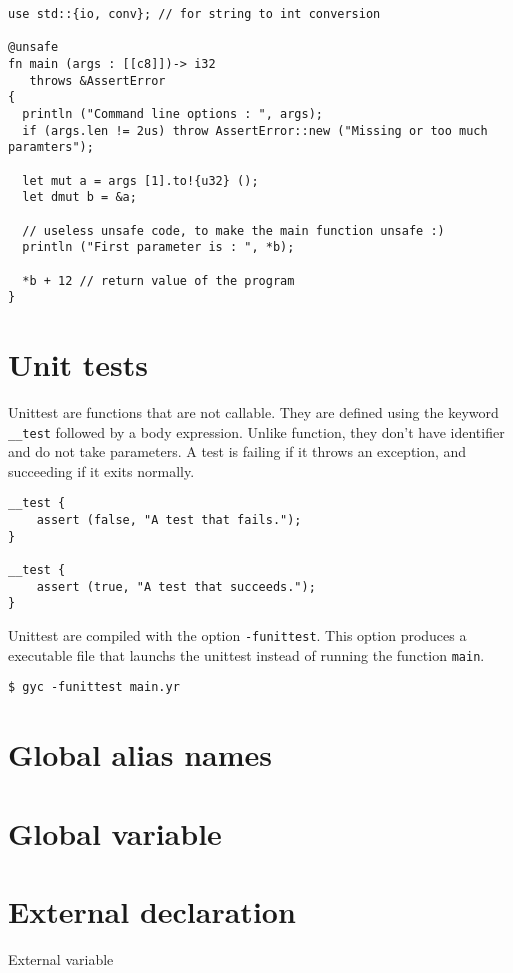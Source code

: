 \begin{lstlisting}[style=coloredverbatim, caption=The most complex main function]
use std::{io, conv}; // for string to int conversion

@unsafe
fn main (args : [[c8]])-> i32
   throws &AssertError
{
  println ("Command line options : ", args);
  if (args.len != 2us) throw AssertError::new ("Missing or too much paramters");

  let mut a = args [1].to!{u32} ();
  let dmut b = &a;

  // useless unsafe code, to make the main function unsafe :)
  println ("First parameter is : ", *b);

  *b + 12 // return value of the program
}
\end{lstlisting}



\section{Unit tests}%
\label{sec:unit_test}

Unittest are functions that are not callable. They are defined using the keyword
\texttt{\_\_test} followed by a body expression. Unlike function, they don't
have identifier and do not take parameters. A test is failing if it throws an
exception, and succeeding if it exits normally.

\begin{lstlisting}[style=coloredverbatim]
__test {
    assert (false, "A test that fails.");
}

__test {
    assert (true, "A test that succeeds.");
}
\end{lstlisting}


Unittest are compiled with the option \texttt{-funittest}. This option produces
a executable file that launchs the unittest instead of running the function
\texttt{main}.

\begin{lstlisting}[style=intermediateVerb]
$ gyc -funittest main.yr
\end{lstlisting}

\section{Global alias names}
\label{sec:global_alias_names}


\section{Global variable}%
\label{sec:global_variables}

\section{External declaration}%
\label{sec:extern_var}

External variable
